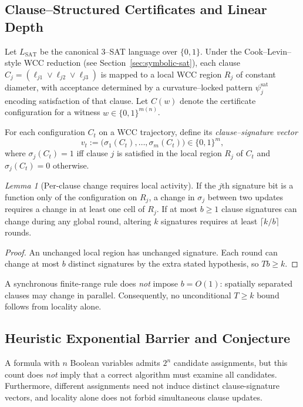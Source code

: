 \documentclass[12pt]{article}
\newcommand{\SAT}{\mathrm{SAT}}
\theoremstyle{remark}
\newtheorem{lemma}[theorem]{Lemma}
\begin{document}
\subsection{Clause–Structured Certificates and Linear Depth}

Let $L_{\SAT}$ be the canonical 3–SAT language over $\{0,1\}$. Under the
Cook–Levin–style WCC reduction (see Section~\ref{sec:symbolic-sat}), each
clause $C_j = (\ell_{j1} \lor \ell_{j2} \lor \ell_{j3})$ is mapped to a local WCC
region $R_j$ of constant diameter, with acceptance determined by a
curvature–locked pattern $\psi_j^\mathrm{sat}$ encoding satisfaction of that
clause. Let $C(w)$ denote the certificate configuration for a witness
$w \in \{0,1\}^{m(n)}$.

For each configuration $C_t$ on a WCC trajectory, define its
\emph{clause–signature vector}
\[
v_t := \bigl(\sigma_1(C_t),\dots,\sigma_m(C_t)\bigr) \in \{0,1\}^m,
\]
where $\sigma_j(C_t) = 1$ iff clause $j$ is satisfied in the local region $R_j$
of $C_t$ and $\sigma_j(C_t) = 0$ otherwise.

\begin{lemma}[Per-clause change requires local activity]
\label{lem:clause_flip}
If the $j$th signature bit is a function only of the configuration on
$R_j$, a change in $\sigma_j$ between two updates requires a change
in at least one cell of $R_j$. If at most $b\ge1$ clause signatures
can change during any global round, altering $k$ signatures requires
at least $\lceil k/b\rceil$ rounds.
\end{lemma}
\begin{proof}
An unchanged local region has unchanged signature. Each round can
change at most $b$ distinct signatures by the extra stated
hypothesis, so $T b\ge k$.
\end{proof}
\noindent A synchronous finite-range rule does \emph{not} impose
$b=O(1)$: spatially separated clauses may change in parallel.
Consequently, no unconditional $T\ge k$ bound follows from
locality alone.

\subsection{Heuristic Exponential Barrier and Conjecture}

A formula with $n$ Boolean variables admits $2^n$ candidate
assignments, but this count does \emph{not} imply that a correct
algorithm must examine all candidates. Furthermore, different
assignments need not induce distinct clause-signature vectors, and
locality alone does not forbid simultaneous clause updates.
\end{document}
